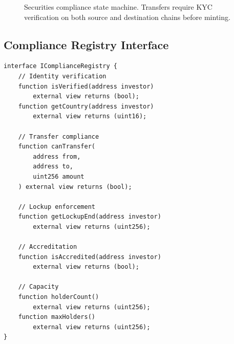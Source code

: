 \documentclass[11pt,twocolumn]{article}
\theoremstyle{definition}
\begin{document}
\begin{figure}[h]
\centering
{}
\caption{Securities compliance state machine. Transfers require KYC verification on both source and destination chains before minting.}
\label{fig:compliance-sm}
\end{figure}

\subsection{Compliance Registry Interface}

\begin{lstlisting}[language=Solidity,caption=IComplianceRegistry interface]
interface IComplianceRegistry {
    // Identity verification
    function isVerified(address investor)
        external view returns (bool);
    function getCountry(address investor)
        external view returns (uint16);

    // Transfer compliance
    function canTransfer(
        address from,
        address to,
        uint256 amount
    ) external view returns (bool);

    // Lockup enforcement
    function getLockupEnd(address investor)
        external view returns (uint256);

    // Accreditation
    function isAccredited(address investor)
        external view returns (bool);

    // Capacity
    function holderCount()
        external view returns (uint256);
    function maxHolders()
        external view returns (uint256);
}
\end{lstlisting}
\end{document}
